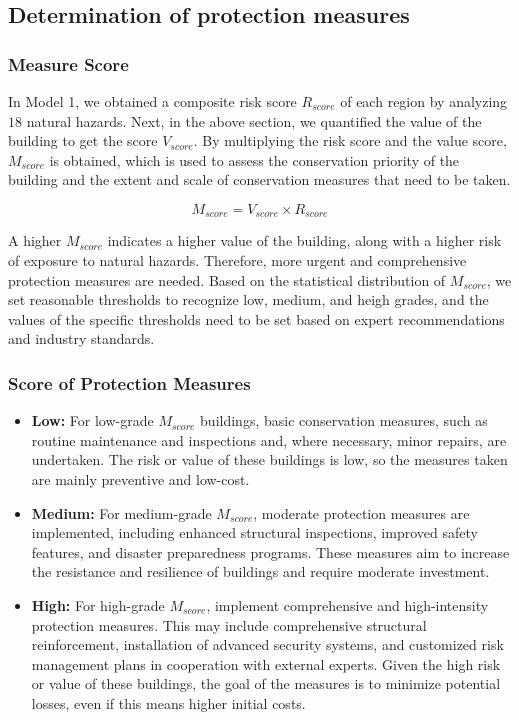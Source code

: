 \documentclass{mcmthesis}
\begin{document}

\subsection{Determination of protection measures}

\subsubsection{Measure Score}

In Model 1, we obtained a composite risk score $R_{score}$ of each region by analyzing $18$
natural hazards. Next, in the above section, we quantified the value of the building to get the
score $V_{score}$. By multiplying the risk score and the value score, $M_{score}$ is obtained, which is
used to assess the conservation priority of the building and the extent and scale of conservation
measures that need to be taken.

\begin{equation}
M_{score} = V_{score} \times R_{score}
\end{equation}

A higher $M_{score}$ indicates a higher value of the building, along with a higher risk of exposure
to natural hazards. Therefore, more urgent and comprehensive protection measures are
needed. Based on the statistical distribution of $M_{score}$, we set reasonable thresholds to recognize
low, medium, and heigh grades, and the values of the specific thresholds need to be set
based on expert recommendations and industry standards.

\subsubsection{Score of Protection Measures}

\begin{itemize}
\item {\bf Low:} For low-grade $M_{score}$ buildings, basic conservation measures, such as routine
maintenance and inspections and, where necessary, minor repairs, are undertaken. The risk or
value of these buildings is low, so the measures taken are mainly preventive and low-cost.
\item {\bf Medium:} For medium-grade $M_{score}$, moderate protection measures are implemented, including
enhanced structural inspections, improved safety features, and disaster preparedness
programs. These measures aim to increase the resistance and resilience of buildings and require
moderate investment.
\item {\bf High:} For high-grade $M_{score}$, implement comprehensive and high-intensity protection
measures. This may include comprehensive structural reinforcement, installation of advanced
security systems, and customized risk management plans in cooperation with external experts.
Given the high risk or value of these buildings, the goal of the measures is to minimize potential
losses, even if this means higher initial costs.
\end{itemize}
\end{document}
